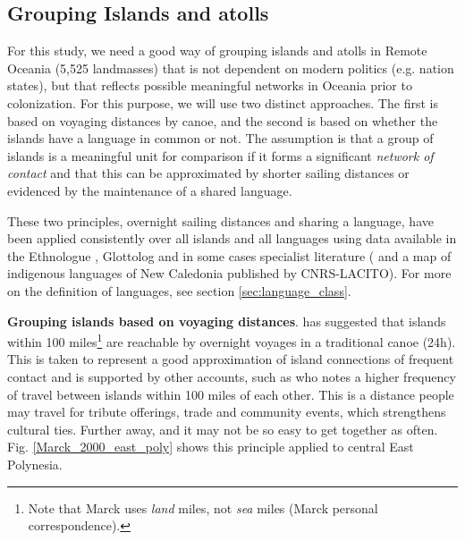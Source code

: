 \documentclass[unnumsec,webpdf,modern,medium]{oup-authoring-template}
\begin{document}
\begin{appendices}
\FloatBarrier
\subsection{Grouping Islands and atolls}
\label{sec:island_geo}


For this study, we need a good way of grouping islands and atolls in Remote Oceania (5,525 landmasses) that is not dependent on modern politics (e.g. nation states), but that reflects possible meaningful networks in Oceania prior to colonization. For this purpose, we will use two distinct approaches. The first is based on voyaging distances by canoe, and the second is based on whether the islands have a language in common or not. The assumption is that a group of islands is a meaningful unit for comparison if it forms a significant \textit{network of contact} and that this can be approximated by shorter sailing distances or evidenced by the maintenance of a shared language. 

These two principles, overnight sailing distances and sharing a language, have been applied consistently over all islands and all languages using data available in the Ethnologue \citep{ethnologue22}, Glottolog \citep{glottolog3} and in some cases specialist literature (\citet{faaniu1983tuvalu,charpentier2012linguistic, francoisetatl2015, macdonald_2020, omniglot_tuvaluan} and a map of indigenous languages of New Caledonia published by CNRS-LACITO). For more on the definition of languages, see section \ref{sec:language_class}.




\textbf{Grouping islands based on voyaging distances}. \citet{mark_1986, marck2000} has suggested that islands within 100 miles\footnote{Note that Marck uses \emph{land} miles, not \emph{sea} miles (Marck personal correspondence).} are reachable by overnight voyages in a traditional canoe (24h). This is taken to represent a good approximation of island connections of frequent contact and is supported by other accounts, such as \citep[38]{gladwin2009east} who notes a higher frequency of travel between islands within 100 miles of each other. This is a distance people may travel for tribute offerings, trade and community events, which strengthens cultural ties. Further away, and it may not be so easy to get together as often. Fig. \ref{Marck_2000_east_poly} shows this principle applied to central East Polynesia.


\end{appendices}
\end{document}
